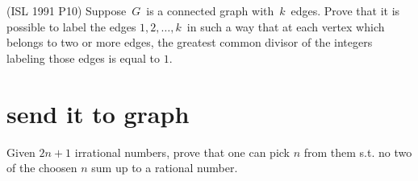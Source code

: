 \documentclass[12pt,a4paper]{article}
\begin{document}
		\begin{problem}(ISL 1991 P10)
			Suppose $ \,G\,$ is a connected graph with $ \,k\,$ edges. Prove that it is possible to label the edges $ 1,2,\ldots ,k\,$ in such a way that at each vertex which belongs to two or more edges, the greatest common divisor of the integers labeling those edges is equal to $ 1 $.
		\end{problem}
	
	\section{send it to graph}
	
	\begin{problem}
		Given $ 2n+1 $ irrational numbers, prove that one can pick $ n $ from them s.t. no two of the choosen $ n $ sum up to a rational number.
	\end{problem}
\end{document}
